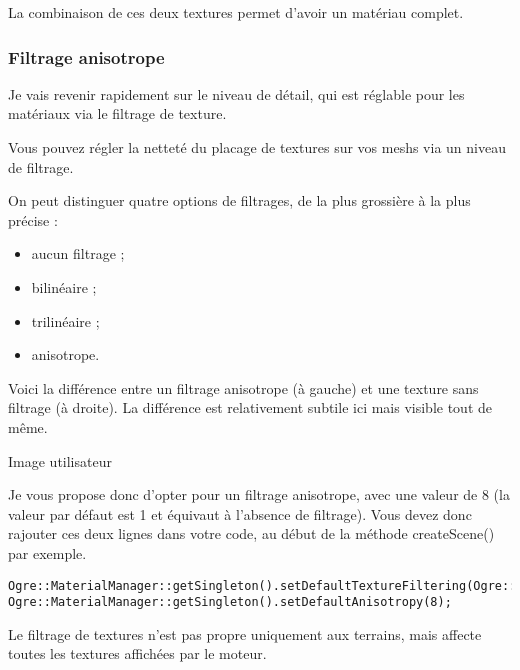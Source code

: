 \documentclass[10pt,a4paper]{report}
\begin{document}
La combinaison de ces deux textures permet d'avoir un mat\'eriau complet.



\subsubsection{Filtrage anisotrope}


Je vais revenir rapidement sur le niveau de d\'etail, qui est r\'eglable pour les mat\'eriaux via le filtrage de texture.

Vous pouvez r\'egler la nettet\'e du placage de textures sur vos meshs via un niveau de filtrage.

On peut distinguer quatre options de filtrages, de la plus grossi\`ere \`a la plus pr\'ecise :

\begin{itemize}
\item aucun filtrage ;
\item bilin\'eaire ;
\item trilin\'eaire ;
\item anisotrope.
\end{itemize}


Voici la diff\'erence entre un filtrage anisotrope (\`a gauche) et une texture sans filtrage (\`a droite). La diff\'erence est relativement subtile ici mais visible tout de m\^eme.

Image utilisateur

Je vous propose donc d'opter pour un filtrage anisotrope, avec une valeur de 8 (la valeur par d\'efaut est 1 et \'equivaut \`a l'absence de filtrage). Vous devez donc rajouter ces deux lignes dans votre code, au d\'ebut de la m\'ethode createScene() par exemple.

\begin{lstlisting}[caption={Choix d'un filtrage anisotrope}]
Ogre::MaterialManager::getSingleton().setDefaultTextureFiltering(Ogre::TFO\_ANISOTROPIC);
Ogre::MaterialManager::getSingleton().setDefaultAnisotropy(8);
\end{lstlisting}

Le filtrage de textures n'est pas propre uniquement aux terrains, mais affecte toutes les textures affich\'ees par le moteur.
\end{document}
